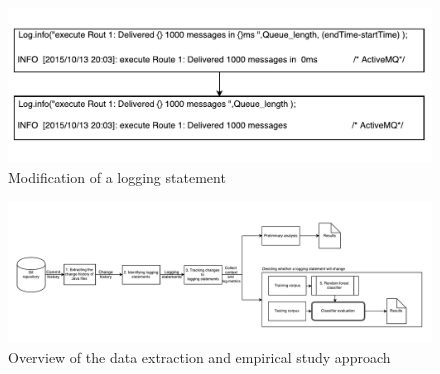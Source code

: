 \begin{figure}[t]
	\centering
	\includegraphics[width=1\columnwidth]{ExampleOfLogChange_LPA}
	\caption{Modification of a logging statement}
	\label{fig:ExampleOfLogChange_LPA}
\end{figure}

\begin{figure}[t]
	\centering

	\includegraphics[width=2\columnwidth,
	height=.65\columnwidth,trim={0 1cm 0 1cm },clip]{LogGenalogyMethdology}



	\caption{Overview of the data extraction and empirical study approach}
	\label{fig:LGmethod}
\end{figure}



